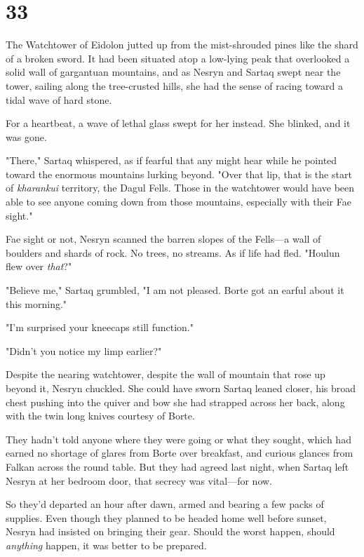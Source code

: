 
\chapter{33}

The Watchtower of Eidolon jutted up from the mist-shrouded pines like the shard of a broken sword.
It had been situated atop a low-lying peak that overlooked a solid wall of gargantuan mountains, and as Nesryn and Sartaq swept near the tower, sailing along the tree-crusted hills, she had the sense of racing toward a tidal wave of hard stone.

For a heartbeat, a wave of lethal glass swept for her instead.
She blinked, and it was gone.

"There," Sartaq whispered, as if fearful that any might hear while he pointed toward the enormous mountains lurking beyond.
"Over that lip, that is the start of \emph{kharankui} territory, the Dagul Fells.
Those in the watchtower would have been able to see anyone coming down from those mountains, especially with their Fae sight."

Fae sight or not, Nesryn scanned the barren slopes of the Fells---a wall of boulders and shards of rock.
No trees, no streams.
As if life had fled.
"Houlun flew over \emph{that}?"

"Believe me," Sartaq grumbled, "I am not pleased.
Borte got an earful about it this morning."

"I'm surprised your kneecaps still function."

"Didn't you notice my limp earlier?"

Despite the nearing watchtower, despite the wall of mountain that rose up beyond it, Nesryn chuckled.
She could have sworn Sartaq leaned closer, his broad chest pushing into the quiver and bow she had strapped across her back, along with the twin long knives courtesy of Borte.

They hadn't told anyone where they were going or what they sought, which had earned no shortage of glares from Borte over breakfast, and curious glances from Falkan across the round table.
But they had agreed last night, when Sartaq left Nesryn at her bedroom door, that secrecy was vital---for now.

So they'd departed an hour after dawn, armed and bearing a few packs of supplies.
Even though they planned to be headed home well before sunset, Nesryn had insisted on bringing their gear.
Should the worst happen, should \emph{anything} happen, it was better to be prepared.

